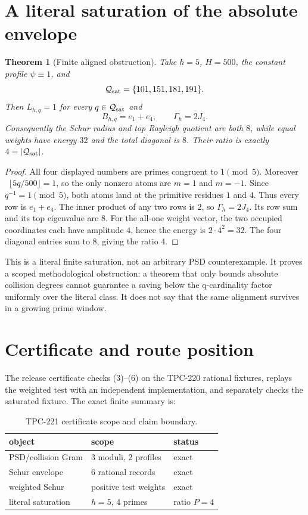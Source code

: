 \documentclass[11pt]{article}
\newtheorem{theorem}{Theorem}
\newcommand{\G}{\Gamma}
\begin{document}
\section{A literal saturation of the absolute envelope}

\begin{theorem}[Finite aligned obstruction]
Take $h=5$, $H=500$, the constant profile $\psi\equiv1$, and
\[
 \mathcal Q_{\rm sat}=\{101,151,181,191\}.
\]
Then $L_{h,q}=1$ for every $q\in\mathcal Q_{\rm sat}$ and
\[
 B_{h,q}=e_1+e_4,\qquad
 \G_h=2J_4.
\]
Consequently the Schur radius and top Rayleigh quotient are both $8$, while equal
weights have energy $32$ and the total diagonal is $8$.  Their ratio is exactly
$4=|\mathcal Q_{\rm sat}|$.
\end{theorem}

\begin{proof}
All four displayed numbers are primes congruent to $1\pmod 5$.  Moreover
\ $\lfloor5q/500\rfloor=1$, so the only nonzero atoms are $m=1$ and $m=-1$.
Since $q^{-1}=1\pmod5$, both atoms land at the primitive residues $1$ and $4$.
Thus every row is $e_1+e_4$.  The inner product of any two rows is $2$, so
$\G_h=2J_4$.  Its row sum and its top eigenvalue are $8$.  For the all-one weight vector,
the two occupied coordinates each have amplitude $4$, hence the energy is $2\cdot4^2=32$.
The four diagonal entries sum to $8$, giving the ratio $4$.
\end{proof}

This is a literal finite saturation, not an arbitrary PSD counterexample.  It proves a
scoped methodological obstruction: a theorem that only bounds absolute collision degrees
cannot guarantee a saving below the q-cardinality factor uniformly over the literal class.
It does not say that the same alignment survives in a growing prime window.

\section{Certificate and route position}

The release certificate checks (3)--(6) on the TPC-220 rational fixtures, replays the
weighted test with an independent implementation, and separately checks the saturated
fixture.  The exact finite summary is:

\begin{table}[t]
\centering
\begin{tabular}{lll}
\toprule
object & scope & status\\
\midrule
PSD/collision Gram & 3 moduli, 2 profiles & exact\\
Schur envelope & 6 rational records & exact\\
weighted Schur & positive test weights & exact\\
literal saturation & $h=5$, 4 primes & ratio $P=4$\\
\bottomrule
\end{tabular}
\caption{TPC-221 certificate scope and claim boundary.}
\end{table}
\end{document}
